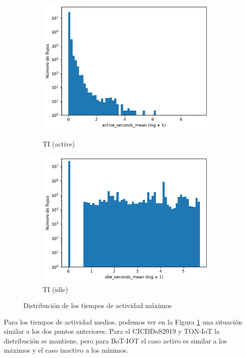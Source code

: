\begin{figure}[H]
\begin{subfigure}[b]{0.26\textwidth}
        \includegraphics[width=\linewidth]{media/packet_pincer_toniot/active_seconds_mean_log_x_log_y.png}
        \caption{TI (active)}
        \includegraphics[width=\linewidth]{media/packet_pincer_toniot/idle_seconds_mean_log_x_log_y.png}
        \caption{TI (idle)}
    \end{subfigure}
       \caption{Distribución de los tiempos de actividad máximos}
       \label{fig:packet_pincer_active_seconds_mean}
\end{figure}

Para los tiempos de actividad medios, podemos ver en la Figura \ref{fig:packet_pincer_active_seconds_mean} una situación similar a los dos puntos anteriores. Para el CICDDoS2019 y TON-IoT la distribución se mantiene, pero para BoT-IOT el caso activo es similar a los máximos y el caso inactivo a los mínimos.

